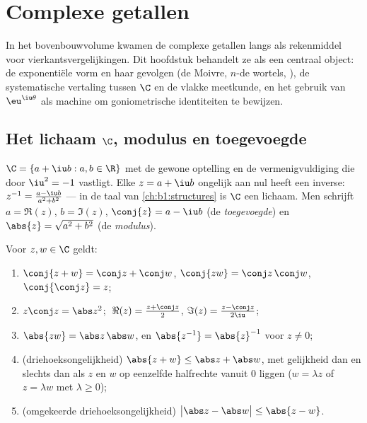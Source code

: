 \chapter{Complexe getallen}\label{ch:b1:complex}

In het bovenbouwvolume kwamen de complexe getallen langs als rekenmiddel
voor vierkantsvergelijkingen. Dit hoofdstuk behandelt ze als een centraal
object: de exponentiële vorm en haar gevolgen (de Moivre, $n$-de wortels,
), de systematische vertaling tussen $\C$ en de vlakke
meetkunde, en het gebruik van $\eu^{\iu\theta}$ als machine om
goniometrische identiteiten te bewijzen.

\section{Het lichaam $\C$, modulus en toegevoegde}

\begin{definition}\label{def:b1:complex:field}
$\C = \{a + \iu b : a, b \in \R\}$ met de gewone optelling en de
vermenigvuldiging die door $\iu^2 = -1$ vastligt. Elke $z = a + \iu b$
ongelijk aan nul heeft een inverse: $z^{-1} = \frac{a - \iu b}{a^2 +
b^2}$ --- in de taal van \cref{ch:b1:structures} is $\C$ een lichaam. Men
schrijft $a = \Re(z)$, $b = \Im(z)$, $\conj{z} = a - \iu b$ (de
\emph{toegevoegde}) en $\abs{z} = \sqrt{a^2 + b^2}$
(de \emph{modulus}).
\end{definition}

\begin{proposition}\label{prop:b1:complex:rules}
Voor $z, w \in \C$ geldt:
\begin{enumerate}
  \item $\conj{z + w} = \conj z + \conj w$, $\conj{zw} = \conj z\,
        \conj w$, $\conj{\conj z} = z$;
  \item $z \conj z = \abs z^2$; $\;\Re(z) = \frac{z + \conj z}{2}$,
        $\Im(z) = \frac{z - \conj z}{2\iu}$;
  \item $\abs{zw} = \abs z\, \abs w$, en $\abs{z^{-1}} = \abs{z}^{-1}$
        voor $z \neq 0$;
  \item (driehoeksongelijkheid) $\abs{z +
        w} \leq \abs z + \abs w$, met gelijkheid dan en slechts dan als
        $z$ en $w$ op eenzelfde halfrechte vanuit $0$ liggen ($w =
        \lambda z$ of $z = \lambda w$ met $\lambda \geq 0$);
  \item (omgekeerde driehoeksongelijkheid) $\bigl|\abs z - \abs
        w\bigr| \leq \abs{z - w}$.
\end{enumerate}
\end{proposition}

